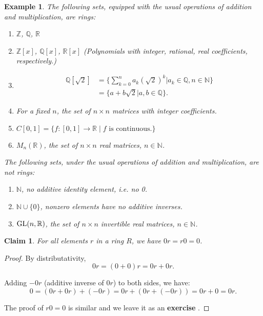 \documentclass[a4paper,12pt]{report}
\newcommand{\GL}{{\rm GL}}
\newcounter{statement}
\numberwithin{statement}{chapter}
\newtheorem{claim}[statement]{Claim}
\newtheorem{eg}[statement]{\bf Example}
\numberwithin{equation}{chapter}
\numberwithin{section}{chapter}
\numberwithin{subsection}{section}
\begin{document}
\begin{eg}
The following sets, equipped with the usual operations of addition and multiplication,
are rings:
\begin{enumerate}
\item 
$\mathbb{Z}$, $\mathbb{Q}$, $\mathbb{R}$

\item 
$\mathbb{Z}[x]$, $\mathbb{Q}[x]$, $\mathbb{R}[x]$
(Polynomials with integer, rational, real coefficients, respectively.)

\item 
\[
\begin{split}
\mathbb{Q}[\sqrt{2}] &=
\{\sum_{k = 0}^n a_k(\sqrt{2})^k | a_k \in \mathbb{Q}, n \in \mathbb{N}\}\\
&= \{a + b\sqrt{2} | a, b \in \mathbb{Q}\}.
\end{split}
\]

\item 
For a fixed $n$, the set of $n\times n$ matrices with integer coefficients.

\item 
$C[0, 1] = \{f : [0, 1]\rightarrow \mathbb{R}\; |\; f \text{ is continuous.}\}$

\item 
$M_n(\mathbb{R})$,
the set of $n \times n$ real matrices, $n \in \mathbb{N}$.
\end{enumerate}



The following sets, under the usual operations of addition and multiplication, are not rings:
\begin{enumerate}
\item 
$\mathbb{N}$, no additive identity element, i.e. no 0.

\item 
$\mathbb{N}\cup\{0\}$, nonzero elements have no additive inverses.

\item 
$\GL(n, \mathbb{R})$,
the set of $n \times n$ invertible real matrices, $n \in \mathbb{N}$.
\end{enumerate}
\end{eg}







\begin{claim}
For all elements $r$ in a ring $R$, we have $0r = r0 = 0$.
\end{claim}
\begin{proof}

By distributativity,
\[
0r = (0 + 0)r = 0r + 0r.
\]

Adding $-0r$ (additive inverse of $0r$) to both sides, we have:
\[
0 = (0r + 0r) + (-0r) = 0r + (0r + (-0r)) = 0r + 0 = 0r.
\]




The proof of $r0 = 0$ is similar and we leave it as an  {\bf exercise} .


\end{proof}
\end{document}
